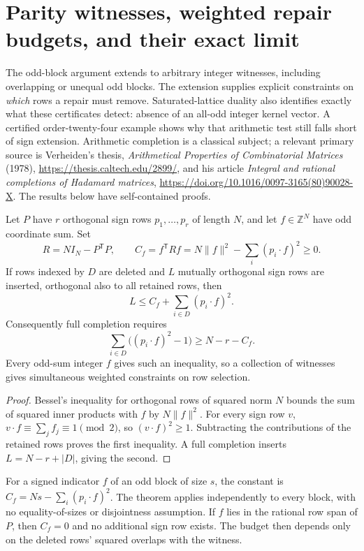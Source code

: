 \section{Parity witnesses, weighted repair budgets, and their exact limit}
\label{sec:parity-repair}

The odd-block argument extends to arbitrary integer witnesses, including
overlapping or unequal odd blocks. The extension supplies explicit
constraints on \emph{which} rows a repair must remove. Saturated-lattice
duality also identifies exactly what these certificates detect: absence
of an all-odd integer kernel vector. A certified order-twenty-four
example shows why that arithmetic test still falls short of sign
extension. Arithmetic completion is a classical subject; a relevant
primary source is Verheiden's thesis,
\emph{Arithmetical Properties of Combinatorial Matrices} (1978),
\url{https://thesis.caltech.edu/2899/}, and his article
\emph{Integral and rational completions of Hadamard matrices},
\url{https://doi.org/10.1016/0097-3165(80)90028-X}.
The results below have self-contained proofs.

\begin{theorem}
Let $P$ have $r$ orthogonal sign rows $p_1,\ldots,p_r$ of length $N$,
and let $f\in\mathbb Z^N$ have odd coordinate sum. Set
\[
 R=NI_N-P^{\mathsf T}P,\qquad
 C_f=f^{\mathsf T}Rf
     =N\|f\|^2-\sum_i(p_i\cdot f)^2\ge0.
\]
If rows indexed by $D$ are deleted and $L$ mutually orthogonal sign
rows are inserted, orthogonal also to all retained rows, then
\[
 L\le C_f+\sum_{i\in D}(p_i\cdot f)^2.
\]
Consequently full completion requires
\[
 \sum_{i\in D}\bigl((p_i\cdot f)^2-1\bigr)
       \ge N-r-C_f.
\]
Every odd-sum integer $f$ gives such an inequality, so a collection
of witnesses gives simultaneous weighted constraints on row selection.
\end{theorem}
\begin{proof}
Bessel's inequality for orthogonal rows of squared norm $N$ bounds
the sum of squared inner products with $f$ by $N\|f\|^2$.
For every sign row $v$, $v\cdot f\equiv\sum_j f_j\equiv1\pmod2$,
so $(v\cdot f)^2\ge1$. Subtracting the contributions of the retained
rows proves the first inequality. A full completion inserts
$L=N-r+|D|$, giving the second.
\end{proof}

For a signed indicator $f$ of an odd block of size $s$, the constant
is $C_f=Ns-\sum_i(p_i\cdot f)^2$. The theorem applies independently
to every block, with no equality-of-sizes or disjointness assumption.
If $f$ lies in the rational row span of $P$, then $C_f=0$ and no
additional sign row exists. The budget then depends only on the
deleted rows' squared overlaps with the witness.


